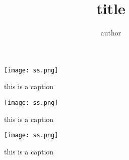 \documentclass[]{amsart}
\begin{document}
\title{title}
\author{author}


\maketitle



\begin{figure}[h] 
 \centering 
 \texttt{[image: ss.png]} 
 
 \caption{this is a caption} 
 \end{figure} \begin{figure}[h] 
 \centering 
 \texttt{[image: ss.png]} 
 
 \caption{this is a caption} 
 \end{figure} \begin{figure}[h] 
 \centering 
 \texttt{[image: ss.png]} 
 
 \caption{this is a caption} 
 \end{figure} 
\end{document}
